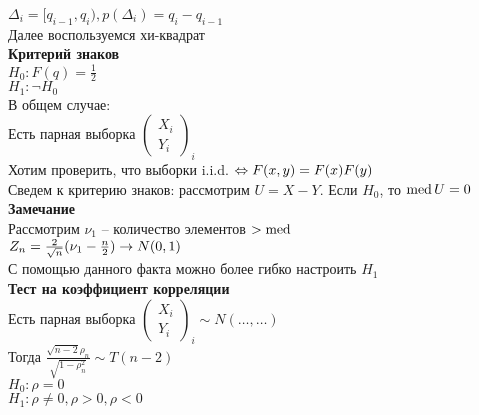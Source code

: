 \documentclass[12pt]{article}
\begin{document}
$\Delta_i = [q_{i-1}, q_i), p(\Delta_i) = q_{i} - q_{i-1}$\\
Далее воспользуемся хи-квадрат\\
\textbf{Критерий знаков}\\
$H_0: F(q) = \frac12$\\
$H_1: \lnot H_0$\\
В общем случае:\\
Есть парная выборка $\left(\begin{array}{c}
	X_i\\Y_i
\end{array}\right)_i$\\
Хотим проверить, что выборки i.i.d. $\Leftrightarrow F(x, y) = F(x) F(y)$\\
Сведем к критерию знаков: рассмотрим $U=X-Y$. Если $H_0$, то $\operatorname{med} U = 0$\\
\textbf{Замечание}\\
Рассмотрим $\nu_1$ -- количество элементов $>\operatorname{med}$\\
$Z_n = \frac{2}{\sqrt{n}}(\nu_1 - \frac n2) \rightarrow N(0,1)$\\
С помощью данного факта можно более гибко настроить $H_1$\\
\textbf{Тест на коэффициент корреляции}\\
Есть парная выборка $\left(\begin{array}{c}
	X_i\\Y_i
\end{array}\right)_i \sim N(\ldots, \ldots)$\\
Тогда $\frac{\sqrt{n-2}\rho_n}{\sqrt{1-\rho_n^2}} \sim T(n-2)$\\
$H_0: \rho=0$\\
$H_1: \rho \neq 0, \rho > 0, \rho < 0$
\end{document}
